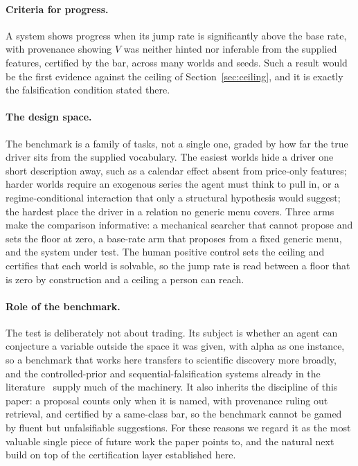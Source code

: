 \documentclass[11pt]{article}
\begin{document}
\paragraph{Criteria for progress.} A system shows progress when its jump rate is
significantly above the base rate, with provenance showing $V$ was neither hinted nor inferable from
the supplied features, certified by the bar, across many worlds and seeds. Such a result would be the
first evidence against the ceiling of Section~\ref{sec:ceiling}, and it is exactly the falsification
condition stated there.

\paragraph{The design space.} The benchmark is a family of tasks, not a single one, graded by how far
the true driver sits from the supplied vocabulary. The easiest worlds hide a driver one short
description away, such as a calendar effect absent from price-only features; harder worlds require an
exogenous series the agent must think to pull in, or a regime-conditional interaction that only a
structural hypothesis would suggest; the hardest place the driver in a relation no generic menu covers.
Three arms make the comparison informative: a mechanical searcher that cannot propose and sets the
floor at zero, a base-rate arm that proposes from a fixed generic menu, and the system under test. The
human positive control sets the ceiling and certifies that each world is solvable, so the jump rate is
read between a floor that is zero by construction and a ceiling a person can reach.

\paragraph{Role of the benchmark.} The test is deliberately not about trading. Its subject is
whether an agent can conjecture a variable outside the space it was given, with alpha as one instance, so
a benchmark that works here transfers to scientific discovery more broadly, and the controlled-prior and
sequential-falsification systems already in the literature~\cite{physgym,falsify} supply much of the
machinery. It also inherits the discipline of this paper: a proposal counts only when it is named, with
provenance ruling out retrieval, and certified by a same-class bar, so the benchmark cannot be gamed by
fluent but unfalsifiable suggestions. For these reasons we regard it as the most valuable single piece of
future work the paper points to, and the natural next build on top of the certification layer established
here.
\end{document}
